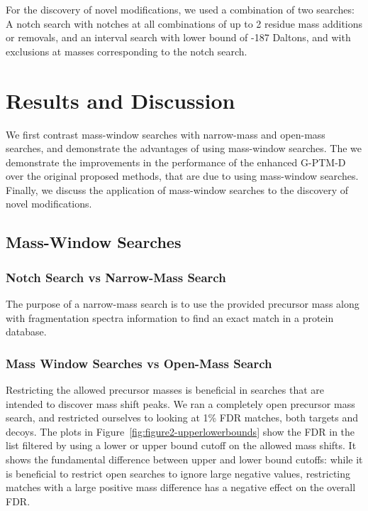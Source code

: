 \documentclass[journal=jprobs,manuscript=article]{achemso}
\begin{document}
For the discovery of novel modifications, we used a combination of two searches: A notch search with notches at all combinations of up to 2 residue mass additions or removals, and an interval search with lower bound of -187 Daltons, and with exclusions at masses corresponding to the notch search.

\section{Results and Discussion}

We first contrast mass-window searches with narrow-mass and open-mass searches, and demonstrate the advantages of using mass-window searches.
The we demonstrate the improvements in the performance of the enhanced G-PTM-D over the original proposed methods, that are due to using mass-window searches.
Finally, we discuss the application of mass-window searches to the discovery of novel modifications.
 
\subsection{Mass-Window Searches}

\subsubsection{Notch Search vs Narrow-Mass Search}

The purpose of a narrow-mass search is to use the provided precursor mass along with fragmentation spectra information to find an exact match in a protein database.

\subsubsection{Mass Window Searches vs Open-Mass Search}

Restricting the allowed precursor masses is beneficial in searches that are intended to discover mass shift peaks.
We ran a completely open precursor mass search, and restricted ourselves to looking at 1\% FDR matches, both targets and decoys.
The plots in Figure~\ref{fig:figure2-upperlowerbounds} show the FDR in the list filtered by using a lower or upper bound cutoff on the allowed mass shifts.
It shows the fundamental difference between upper and lower bound cutoffs: while it is beneficial to restrict open searches to ignore large negative values, restricting matches with a large positive mass difference has a negative effect on the overall FDR.
\end{document}
